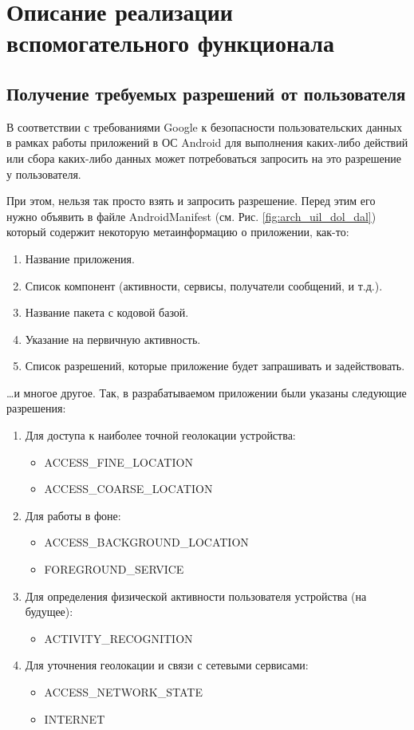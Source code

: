 \chapter{Описание реализации вспомогательного функционала}
\section{Получение требуемых разрешений от пользователя}
В соответствии с требованиями Google к безопасности пользовательских данных в рамках работы приложений в ОС Android для выполнения каких-либо действий или сбора каких-либо данных может потребоваться запросить на это разрешение у пользователя.

При этом, нельзя так просто взять и запросить разрешение. Перед этим его нужно объявить в файле AndroidManifest (см. Рис. \ref{fig:arch_uil_dol_dal}) который содержит некоторую метаинформацию о приложении, как-то:
\begin{enumerate}
	\item Название приложения.
	\item Список компонент (активности, сервисы, получатели сообщений, и т.д.).
	\item Название пакета с кодовой базой.
	\item Указание на первичную активность.
	\item Список разрешений, которые приложение будет запрашивать и задействовать.
\end{enumerate}
\dots и многое другое.
Так, в разрабатываемом приложении были указаны следующие разрешения:
\begin{enumerate}
	\item Для доступа к наиболее точной геолокации устройства:
	\begin{itemize}
		\item ACCESS\_FINE\_LOCATION
		\item ACCESS\_COARSE\_LOCATION
	\end{itemize}
	\item Для работы в фоне:
	\begin{itemize}
		\item ACCESS\_BACKGROUND\_LOCATION
		\item FOREGROUND\_SERVICE
	\end{itemize}
	\item Для определения физической активности пользователя устройства (на будущее):
	\begin{itemize}
		\item ACTIVITY\_RECOGNITION
	\end{itemize}
		\item Для уточнения геолокации и связи с сетевыми сервисами:
	\begin{itemize}
		\item ACCESS\_NETWORK\_STATE
		\item INTERNET
	\end{itemize}
\end{enumerate}

